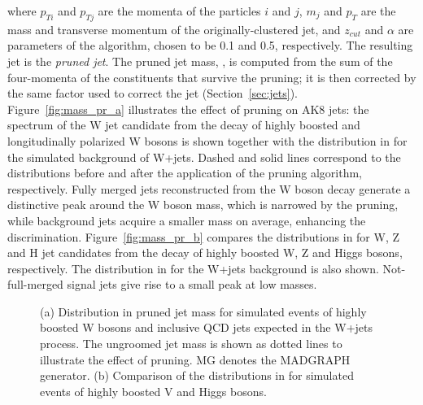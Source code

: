 \noindent where $p_{Ti}$ and $p_{Tj}$ are the momenta of the particles $i$ and $j$, $m_j$ and $p_T$ are the mass and transverse momentum of the originally-clustered jet, and $z_{cut}$ and $\alpha$ are parameters of the algorithm, chosen to be 0.1 and 0.5, respectively. 
The resulting jet is the \emph{pruned jet}. The pruned jet mass, \mJ, is computed from the sum of the four-momenta of the constituents that survive the pruning; it is then corrected by the same factor used to correct the jet \pt (Section~\ref{sec:jets}).
Figure~\ref{fig:mass_pr_a} illustrates the effect of pruning on AK8 jets: the \mJ spectrum of the W jet candidate from the decay of highly boosted and longitudinally polarized W bosons is shown together with the distribution in \mJ for the simulated background of W+jets. Dashed and solid lines correspond to the distributions before and after the application of the pruning algorithm, respectively. Fully merged jets reconstructed from the W boson decay generate a distinctive peak around the W boson mass, which is narrowed by the pruning, while background jets acquire a smaller mass on average, enhancing the discrimination. Figure~\ref{fig:mass_pr_b} compares the distributions in \mJ for W, Z and H jet candidates from the decay of highly boosted W, Z and Higgs bosons, respectively. The distribution in \mJ for the W+jets background is also shown. Not-full-merged signal jets give rise to a small peak at low masses. 

\begin{figure}[!htb]
\centering     %
{}
\caption{(a) Distribution in pruned jet mass \mJ for simulated events of highly boosted W bosons and inclusive QCD jets expected in the W+jets process. The ungroomed jet mass is shown as dotted lines to illustrate the effect of pruning. MG denotes the MADGRAPH generator. (b) Comparison of the distributions in \mJ for simulated events of highly boosted V and Higgs bosons.}
\label{fig:mass_pr}
\end{figure}
 
